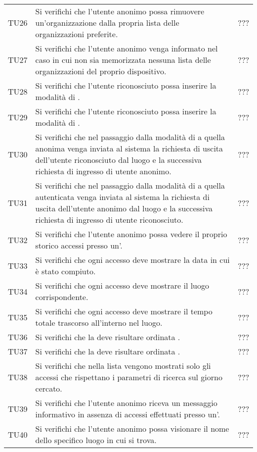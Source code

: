 {\begin{longtable}{ c  C{9cm} C{1cm}}
TU26 & Si verifichi che l'utente anonimo possa rimuovere un'organizzazione dalla propria lista delle organizzazioni preferite. & ??? \\
TU27 & Si verifichi che l'utente anonimo venga informato nel caso in cui non sia memorizzata nessuna lista delle organizzazioni del proprio dispositivo. & ??? \\
TU28 & Si verifichi che l'utente riconosciuto possa inserire la modalità di . & ??? \\
TU29 & Si verifichi che l'utente riconosciuto possa inserire la modalità di . & ??? \\
TU30 & Si verifichi che nel passaggio dalla modalità di  a quella anonima venga inviata al sistema la richiesta di uscita dell'utente riconosciuto dal luogo e la successiva richiesta di ingresso di utente anonimo. & ??? \\
TU31 & Si verifichi che nel passaggio dalla modalità di  a quella autenticata venga inviata al sistema la richiesta di uscita dell'utente anonimo dal luogo e la successiva richiesta di ingresso di utente riconosciuto. & ??? \\
TU32 & Si verifichi che l'utente anonimo possa vedere il proprio storico accessi presso un'. & ??? \\
TU33 & Si verifichi che ogni accesso deve mostrare la data in cui è stato compiuto. & ??? \\
TU34 & Si verifichi che ogni accesso deve mostrare il luogo corrispondente.  & ??? \\
TU35 & Si verifichi che ogni accesso deve mostrare il tempo totale trascorso all'interno nel luogo. & ??? \\
TU36 & Si verifichi che la  deve risultare ordinata . & ??? \\
TU37 & Si verifichi che la  deve risultare ordinata . & ??? \\
TU38 & Si verifichi che nella lista vengono mostrati solo gli accessi che rispettano i parametri di ricerca sul giorno cercato. & ??? \\
TU39 & Si verifichi che l’utente anonimo riceva un messaggio informativo in assenza di accessi effettuati presso un'. & ??? \\
TU40 & Si verifichi che l’utente anonimo possa visionare il nome dello specifico luogo in cui si trova. & ??? \\

\end{longtable}}
